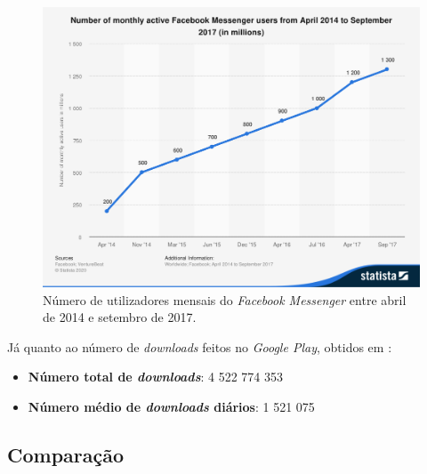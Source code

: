 \begin{figure}[H]
   \begin{center}
       \includegraphics[width=12cm]{img/statistic_id417295_facebook-messenger_-number-of-monthly-active-users-2014-2017.png}
       \caption{Número de utilizadores mensais do \textit{Facebook Messenger} entre abril de 2014 e setembro de 2017. \cite{messenger_monthly_users}}
       \label{graph:messenger_monthly_active}
   \end{center}
\end{figure}

Já quanto ao número de \textit{downloads} feitos no \textit{Google Play}, obtidos em \cite{messenger_downloads_android}:

\begin{itemize}
   \item \textbf{Número total de \textit{downloads}}: 4 522 774 353
   \item \textbf{Número médio de \textit{downloads} diários}: 1 521 075
\end{itemize}


\subsection{Comparação}

